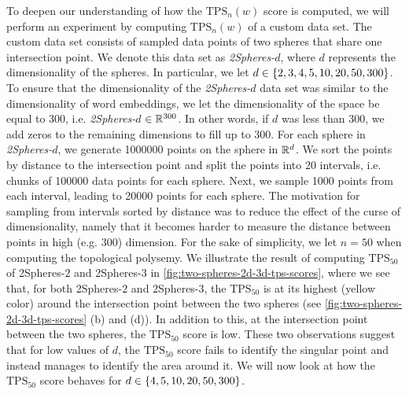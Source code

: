 To deepen our understanding of how the $\text{TPS}_n(w)$ score is computed, we will perform an experiment by computing $\text{TPS}_n(w)$ of a custom data set. The custom data set consists of sampled data points of two spheres that share one intersection point. We denote this data set as \textit{2Spheres-$d$}, where $d$ represents the dimensionality of the spheres. In particular, we let $d \in \left\{2, 3, 4, 5, 10, 20, 50, 300\right\}$. To ensure that the dimensionality of the \textit{2Spheres-$d$} data set was similar to the dimensionality of word embeddings, we let the dimensionality of the space be equal to 300, i.e. \textit{2Spheres-$d$} $\in \mathbb{R}^{300}$. In other words, if $d$ was less than 300, we add zeros to the remaining dimensions to fill up to 300. For each sphere in \textit{2Spheres-$d$}, we generate 1000000 points on the sphere in $\mathbb{R}^d$. We sort the points by distance to the intersection point and split the points into 20 intervals, i.e. chunks of 100000 data points for each sphere. Next, we sample 1000 points from each interval, leading to 20000 points for each sphere. The motivation for sampling from intervals sorted by distance was to reduce the effect of the curse of dimensionality, namely that it becomes harder to measure the distance between points in high (e.g. 300) dimension. For the sake of simplicity, we let $n=50$ when computing the topological polysemy. We illustrate the result of computing $\text{TPS}_{50}$ of 2Spheres-$2$ and 2Spheres-$3$ in \cref{fig:two-spheres-2d-3d-tps-scores}, where we see that, for both 2Spheres-$2$ and 2Spheres-$3$, the $\text{TPS}_{50}$ is at its highest (yellow color) around the intersection point between the two spheres (see \cref{fig:two-spheres-2d-3d-tps-scores} (b) and (d)). In addition to this, at the intersection point between the two spheres, the $\text{TPS}_{50}$ score is low. These two observations suggest that for low values of $d$, the $\text{TPS}_{50}$ score fails to identify the singular point and instead manages to identify the area around it. We will now look at how the $\text{TPS}_{50}$ score behaves for $d \in \left\{4, 5, 10, 20, 50, 300\right\}$.
